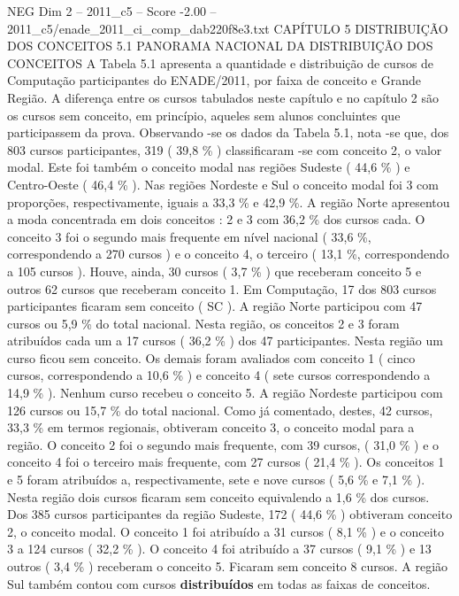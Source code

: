 \begin{textsample}{NEG Dim 2 – 2011\_c5 – Score -2.00 – 2011\_c5/enade\_2011\_ci\_comp\_dab220f8e3.txt}  \label{ex:f2_neg_087}
CAPÍTULO 5 DISTRIBUIÇÃO DOS CONCEITOS 5.1 PANORAMA NACIONAL DA DISTRIBUIÇÃO DOS CONCEITOS A Tabela 5.1 apresenta a quantidade e distribuição de cursos de Computação participantes do ENADE/2011, por faixa de conceito e Grande Região.
A diferença entre os cursos tabulados neste capítulo e no capítulo 2 são os cursos sem conceito, em princípio, aqueles sem alunos concluintes que participassem da prova.
Observando -se os dados da Tabela 5.1, nota -se que, dos 803 cursos participantes, 319 ( 39,8 \% ) classificaram -se com conceito 2, o valor modal.
Este foi também o conceito modal nas regiões Sudeste ( 44,6 \% ) e Centro-Oeste ( 46,4 \% ).
Nas regiões Nordeste e Sul o conceito modal foi 3 com proporções, respectivamente, iguais a 33,3 \% e 42,9 \%.
A região Norte apresentou a moda concentrada em dois conceitos : 2 e 3 com 36,2 \% dos cursos cada.
O conceito 3 foi o segundo mais frequente em nível nacional ( 33,6 \%, correspondendo a 270 cursos ) e o conceito 4, o terceiro ( 13,1 \%, correspondendo a 105 cursos ).
Houve, ainda, 30 cursos ( 3,7 \% ) que receberam conceito 5 e outros 62 cursos que receberam conceito 1.
Em Computação, 17 dos 803 cursos participantes ficaram sem conceito ( SC ).
A região Norte participou com 47 cursos ou 5,9 \% do total nacional.
Nesta região, os conceitos 2 e 3 foram atribuídos cada um a 17 cursos ( 36,2 \% ) dos 47 participantes.
Nesta região um curso ficou sem conceito.
Os demais foram avaliados com conceito 1 ( cinco cursos, correspondendo a 10,6 \% ) e conceito 4 ( sete cursos correspondendo a 14,9 \% ).
Nenhum curso recebeu o conceito 5.
A região Nordeste participou com 126 cursos ou 15,7 \% do total nacional.
Como já comentado, destes, 42 cursos, 33,3 \% em termos regionais, obtiveram conceito 3, o conceito modal para a região.
O conceito 2 foi o segundo mais frequente, com 39 cursos, ( 31,0 \% ) e o conceito 4 foi o terceiro mais frequente, com 27 cursos ( 21,4 \% ).
Os conceitos 1 e 5 foram atribuídos a, respectivamente, sete e nove cursos ( 5,6 \% e 7,1 \% ).
Nesta região dois cursos ficaram sem conceito equivalendo a 1,6 \% dos cursos.
Dos 385 cursos participantes da região Sudeste, 172 ( 44,6 \% ) obtiveram conceito 2, o conceito modal.
O conceito 1 foi atribuído a 31 cursos ( 8,1 \% ) e o conceito 3 a 124 cursos ( 32,2 \% ).
O conceito 4 foi atribuído a 37 cursos ( 9,1 \% ) e 13 outros ( 3,4 \% ) receberam o conceito 5.
Ficaram sem conceito 8 cursos.
A região Sul também contou com cursos \textbf{distribuídos} em todas as faixas de conceitos.

\end{textsample}

